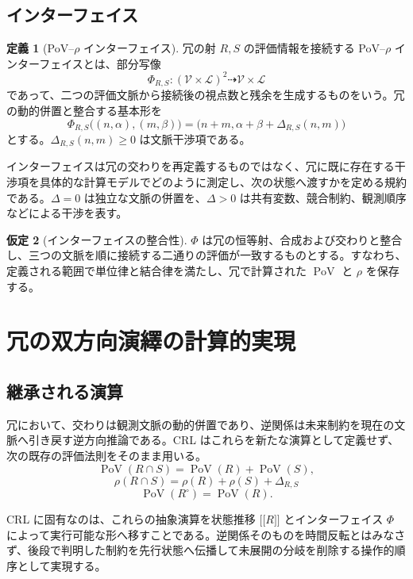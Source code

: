 \documentclass[a4paper,11pt]{ltjsarticle}
\theoremstyle{definition}
\newtheorem{definition}{定義}[section]
\newtheorem{assumption}[definition]{仮定}
\theoremstyle{plain}
\newcommand{\PoV}{\operatorname{PoV}}
\newcommand{\sem}[1]{\mathopen{[\![}#1\mathclose{]\!]}}
\begin{document}
\subsection{インターフェイス}

\begin{definition}[PoV--$\rho$ インターフェイス]
冗の射 $R,S$ の評価情報を接続する PoV--$\rho$ インターフェイスとは、部分写像
\[
 \Phi_{R,S}:
 (\mathcal{V}\times\mathcal{L})^2
 \dashrightarrow
 \mathcal{V}\times\mathcal{L}
\]
であって、二つの評価文脈から接続後の視点数と残余を生成するものをいう。冗の動的併置と整合する基本形を
\[
 \Phi_{R,S}\bigl((n,\alpha),(m,\beta)\bigr)
 =\bigl(n+m,\alpha+\beta+\Delta_{R,S}(n,m)\bigr)
\]
とする。$\Delta_{R,S}(n,m)\geq0$ は文脈干渉項である。
\end{definition}

インターフェイスは冗の交わりを再定義するものではなく、冗に既に存在する干渉項を具体的な計算モデルでどのように測定し、次の状態へ渡すかを定める規約である。$\Delta=0$ は独立な文脈の併置を、$\Delta>0$ は共有変数、競合制約、観測順序などによる干渉を表す。

\begin{assumption}[インターフェイスの整合性]
$\Phi$ は冗の恒等射、合成および交わりと整合し、三つの文脈を順に接続する二通りの評価が一致するものとする。すなわち、定義される範囲で単位律と結合律を満たし、冗で計算された $\PoV$ と $\rho$ を保存する。
\end{assumption}

\section{冗の双方向演繹の計算的実現}

\subsection{継承される演算}

冗において、交わりは観測文脈の動的併置であり、逆関係は未来制約を現在の文脈へ引き戻す逆方向推論である。CRL はこれらを新たな演算として定義せず、次の既存の評価法則をそのまま用いる。
\[
 \PoV(R\cap S)=\PoV(R)+\PoV(S),
\]
\[
 \rho(R\cap S)
 =\rho(R)+\rho(S)+\Delta_{R,S}
\]
\[
 \PoV(R^\circ)=\PoV(R)
 .
\]

CRL に固有なのは、これらの抽象演算を状態推移 $\sem{R}$ とインターフェイス $\Phi$ によって実行可能な形へ移すことである。逆関係そのものを時間反転とはみなさず、後段で判明した制約を先行状態へ伝播して未展開の分岐を削除する操作的順序として実現する。
\end{document}
